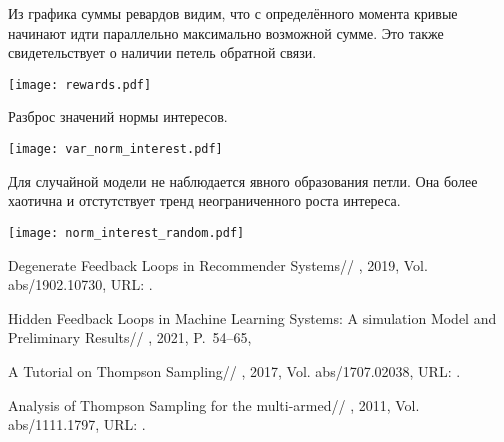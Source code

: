 \documentclass[12pt, twoside]{article}
\begin{document}
Из графика суммы ревардов видим, что с определённого момента кривые начинают идти параллельно максимально возможной сумме. 
Это также свидетельствует о наличии петель обратной связи. 
\begin{center}
  \texttt{[image: rewards.pdf]}
\end{center}

Разброс значений нормы интересов. 
\begin{center}
  \texttt{[image: var\_norm\_interest.pdf]}
\end{center}

Для случайной модели не наблюдается явного образования петли. 
Она более хаотична и отстутствует тренд неограниченного роста интереса.   
\begin{center}
  \texttt{[image: norm\_interest\_random.pdf]}
\end{center}


\begin{thebibliography}{99}
    Degenerate Feedback Loops in Recommender Systems//
    , 2019, Vol. abs/1902.10730,
	  URL: .

    Hidden Feedback Loops in Machine Learning Systems: A simulation Model and Preliminary Results//
    , 2021, P.~54--65,

    A Tutorial on Thompson Sampling//
    , 2017, Vol. abs/1707.02038,
	  URL: .

    Analysis of Thompson Sampling for the multi-armed//
    , 2011, Vol. abs/1111.1797,
	  URL: .
\end{thebibliography}

\end{document}
